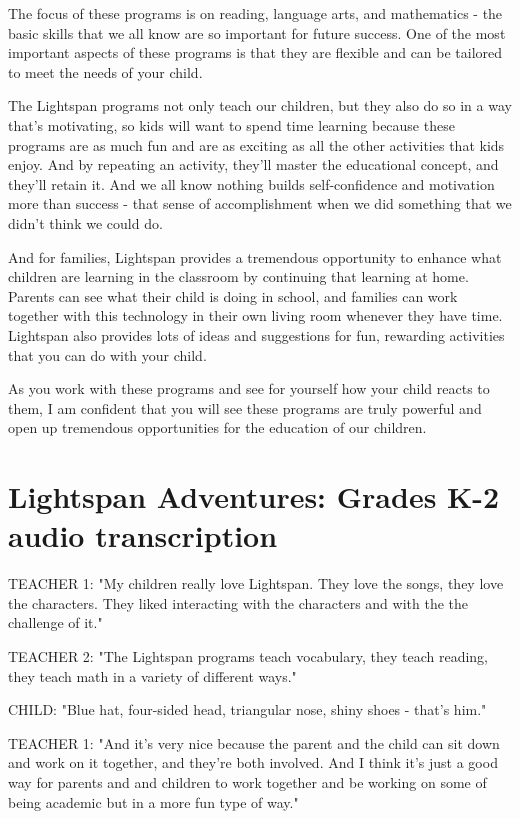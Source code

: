 The focus of these programs is on reading, language arts, and mathematics - the basic skills that we all know are so important for future success.
One of the most important aspects of these programs is that they are flexible and can be tailored to meet the needs of your child.

The Lightspan programs not only teach our children, but they also do so in a way that's motivating, so kids will want to spend time learning because these programs are as much fun and are as exciting as all the other activities that kids enjoy.
And by repeating an activity, they'll master the educational concept, and they'll retain it.
And we all know nothing builds self-confidence and motivation more than success - that sense of accomplishment when we did something that we didn't think we could do.

And for families, Lightspan provides a tremendous opportunity to enhance what children are learning in the classroom by continuing that learning at home.
Parents can see what their child is doing in school, and families can work together with this technology in their own living room whenever they have time.
Lightspan also provides lots of ideas and suggestions for fun, rewarding activities that you can do with your child.

As you work with these programs and see for yourself how your child reacts to them, I am confident that you will see these programs are truly powerful and open up tremendous opportunities for the education of our children.

\section{Lightspan Adventures: Grades K-2 audio transcription}

TEACHER 1: "My children really love Lightspan.
They love the songs, they love the characters.
They liked interacting with the characters and with the the challenge of it."

TEACHER 2: "The Lightspan programs teach vocabulary, they teach reading, they teach math in a variety of different ways."

CHILD: "Blue hat, four-sided head, triangular nose, shiny shoes - that's him."

TEACHER 1: "And it's very nice because the parent and the child can sit down and work on it together, and they're both involved.
And I think it's just a good way for parents and and children to work together and be working on some of being academic but in a more fun type of way."

